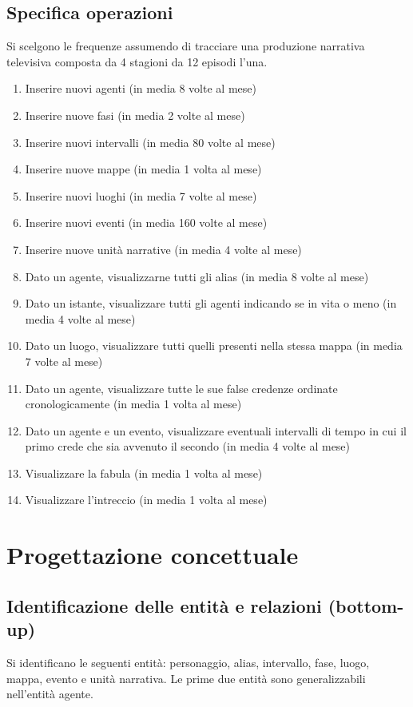 \documentclass{article}
\begin{document}
\subsection{Specifica operazioni}
Si scelgono le frequenze assumendo di tracciare una produzione narrativa
televisiva composta da 4 stagioni da 12 episodi l'una.
\begin{enumerate}
	\item Inserire nuovi agenti (in media 8 volte al mese)
	\item Inserire nuove fasi (in media 2 volte al mese)
	\item Inserire nuovi intervalli (in media 80 volte al mese)
	\item Inserire nuove mappe (in media 1 volta al mese)
	\item Inserire nuovi luoghi (in media 7 volte al mese)
	\item Inserire nuovi eventi (in media 160 volte al mese)
	\item Inserire nuove unità narrative (in media 4 volte al mese)
	\item Dato un agente, visualizzarne tutti gli alias (in media 8 volte al
	      mese)
	\item Dato un istante, visualizzare tutti gli agenti indicando se in vita o
	      meno (in media 4 volte al mese)
	\item Dato un luogo, visualizzare tutti quelli presenti nella stessa mappa (in
	      media 7 volte al mese)
	\item Dato un agente, visualizzare tutte le sue false credenze ordinate
	      cronologicamente (in media 1 volta al mese)
	\item Dato un agente e un evento, visualizzare eventuali intervalli di
	      tempo in cui il primo crede che sia avvenuto il secondo (in media 4
	      volte al mese)
	\item Visualizzare la fabula (in media 1 volta al mese)
	\item Visualizzare l'intreccio (in media 1 volta al mese)
\end{enumerate}


\section{Progettazione concettuale}

\subsection{Identificazione delle entità e relazioni (bottom-up)}
Si identificano le seguenti entità: personaggio, alias, intervallo,
fase, luogo, mappa, evento e unità narrativa.
Le prime due entità sono generalizzabili nell'entità agente.
\end{document}
